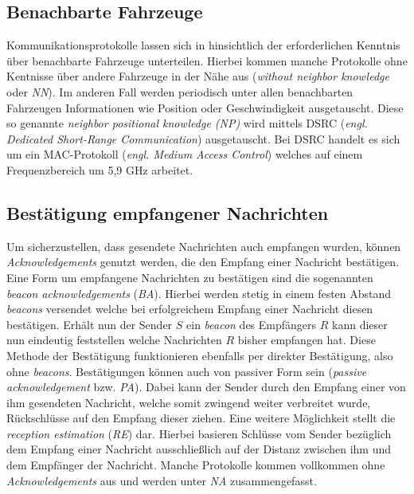\documentclass[english,runningheads,a4paper]{llncs}[2018/03/10]
\begin{document}
\subsection{Benachbarte Fahrzeuge}\label{subsec:benachbarte-fahrzeuge}
Kommunikationsprotokolle lassen sich in hinsichtlich der erforderlichen Kenntnis über benachbarte Fahrzeuge unterteilen.
Hierbei kommen manche Protokolle ohne Kentnisse über andere Fahrzeuge in der Nähe aus (\textit{without neighbor knowledge} oder \textit{NN}).
Im anderen Fall werden periodisch unter allen benachbarten Fahrzeugen Informationen wie Position oder Geschwindigkeit ausgetauscht.
Diese so genannte \textit{neighbor positional knowledge (NP)} wird mittels DSRC (\textit{engl. Dedicated Short-Range Communication}) ausgetauscht.
Bei DSRC handelt es sich um ein MAC-Protokoll (\textit{engl. Medium Access Control}) welches auf einem Frequenzbereich um 5,9 GHz arbeitet\cite{conti2013mobile}.

\subsection{Bestätigung empfangener Nachrichten}
Um sicherzustellen, dass gesendete Nachrichten auch empfangen wurden, können \textit{Acknowledgements} genutzt werden, die den Empfang einer Nachricht bestätigen.
Eine Form um empfangene Nachrichten zu bestätigen sind die sogenannten \textit{beacon acknowledgements} (\textit{BA}).
Hierbei werden stetig in einem festen Abstand \textit{beacons} versendet welche bei erfolgreichem Empfang einer Nachricht diesen bestätigen.
Erhält nun der Sender $S$ ein \textit{beacon} des Empfängers $R$ kann dieser nun eindeutig feststellen welche Nachrichten $R$ bisher empfangen hat.
Diese Methode der Bestätigung funktionieren ebenfalls per direkter Bestätigung, also ohne \textit{beacons}.
Bestätigungen können auch von passiver Form sein (\textit{passive acknowledgement} bzw. \textit{PA}).
Dabei kann der Sender durch den Empfang einer von ihm gesendeten Nachricht, welche somit zwingend weiter verbreitet wurde, Rückschlüsse auf den Empfang dieser ziehen.
Eine weitere Möglichkeit stellt die \textit{reception estimation} (\textit{RE}) dar.
Hierbei basieren Schlüsse vom Sender bezüglich dem Empfang einer Nachricht ausschließlich auf der Distanz zwischen ihm und dem Empfänger der Nachricht.
Manche Protokolle kommen vollkommen ohne \textit{Acknowledgements} aus und werden unter \textit{NA} zusammengefasst\cite{conti2013mobile}.
\end{document}
